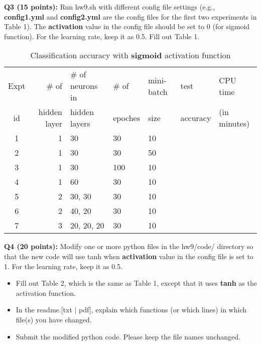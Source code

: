 \documentclass[11pt]{article}
\begin{document}
\vspace{0.5 in}
\hspace{-0.3in}
 {\bf Q3 (15 points):} Run hw9.sh with different config file settings
 (e.g., {\bf config1.yml} and {\bf config2.yml} are the config files
 for the first two experiments in Table 1).
 The {\bf activation} value in the config file should be set to 0 (for sigmoid function). For the learning rate, keep it as 0.5. Fill out Table 1.
         

\begin{table}[h]
\centering
\caption{Classification accuracy with {\bf sigmoid} activation function}
\label{table1}
  \begin{tabular}{|c|r|l|l|l|l|l|} \hline
    Expt & \# of          & \# of neurons in & \# of    & mini-batch & test  & CPU time   \\  
    id   &  hidden layer  & hidden layers    & epoches & size       & accuracy  & (in minutes) \\ \hline

    1   &  1              &  30              &  30     &  10       &     & \\ \hline
    2   &  1              &  30              &  30     &  50       &     & \\ \hline
    3   &  1              &  30              &  100    &  10       &     &  \\ \hline
    4   &  1              &  60              &  30     &  10       &     & \\ \hline
    5   &  2              &  30, 30          &  30     &  10       &     & \\ \hline

    6   &  2              &  40, 20          &  30     &  10       &     & \\ \hline
    
    7   &  3              &  20, 20, 20      &  30     &  10       &     & \\ \hline
  \end{tabular}
\end{table}


\vspace{0.5 in}
\hspace{-0.3in}
{\bf Q4 (20 points):} Modify one or more python files in the hw9/code/ directory so that the new code will use tanh when {\bf activation} value in the config file is set to 1. For the learning rate, keep it as 0.5.
\begin{itemize}
  \item Fill out Table 2, which is the same as Table 1, except that it uses {\bf tanh} as the activation function.
  
  \item In the readme.[txt $\mid$ pdf], explain which functions (or which lines) in which file(s) you have changed.
    
  \item Submit the modified python code. Please keep the file names unchanged.
\end{itemize}
\end{document}
